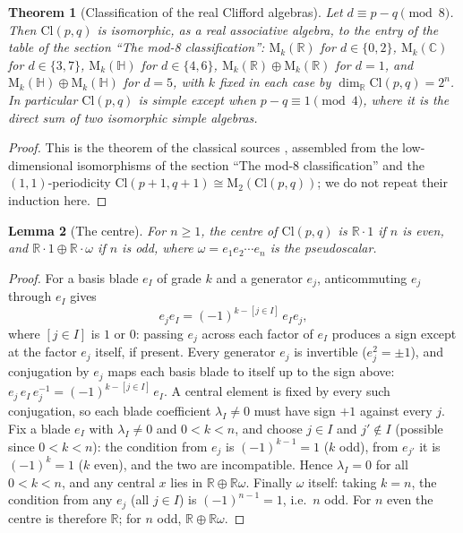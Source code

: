 \documentclass[11pt]{article}
\newtheorem{theorem}{Theorem}[section]
\newtheorem{lemma}[theorem]{Lemma}
\theoremstyle{definition}
\theoremstyle{plain}
\newcommand{\changedmark}[2]{\marginpar{\raggedright\scriptsize\color{#1}#2}}
\providecommand{\C}{}\renewcommand{\C}{\mathbb{C}}
\providecommand{\Cl}{}\renewcommand{\Cl}{\mathrm{Cl}}
\providecommand{\HH}{}\renewcommand{\HH}{\mathbb{H}}
\providecommand{\Mat}{}\renewcommand{\Mat}{\mathrm{M}}
\providecommand{\R}{}\renewcommand{\R}{\mathbb{R}}
\begin{document}
\begin{theorem}[Classification of the real Clifford algebras]\label{c:primer.classification-real-clifford-algebras}
\changedmark{BurntOrange}{changed since the deposit}
Let $d \equiv p - q \pmod 8$. Then $\Cl(p,q)$ is isomorphic, as a real associative algebra, to the entry of the table of the section ``The mod-8 classification'': $\Mat_k(\R)$ for $d \in \{0, 2\}$, $\Mat_k(\C)$ for $d \in \{3, 7\}$, $\Mat_k(\HH)$ for $d \in \{4, 6\}$, $\Mat_k(\R) \oplus \Mat_k(\R)$ for $d = 1$, and $\Mat_k(\HH) \oplus \Mat_k(\HH)$ for $d = 5$, with $k$ fixed in each case by $\dim_\R \Cl(p,q) = 2^n$. In particular $\Cl(p,q)$ is simple except when $p - q \equiv 1 \pmod 4$, where it is the direct sum of two isomorphic simple algebras.
\end{theorem}
\begin{proof}
This is the theorem of the classical sources \cite{ABS1964, Porteous1995, Lounesto2001}, assembled from the low-dimensional isomorphisms of the section ``The mod-8 classification'' and the $(1,1)$-periodicity $\Cl(p{+}1,q{+}1) \cong \Mat_2(\Cl(p,q))$; we do not repeat their induction here.

\end{proof}

\begin{lemma}[The centre]\label{c:primer.centre}
For $n \geq 1$, the centre of $\Cl(p,q)$ is $\R \cdot 1$ if $n$ is even, and $\R \cdot 1 \oplus \R \cdot \omega$ if $n$ is odd, where $\omega = e_1 e_2 \cdots e_n$ is the pseudoscalar.
\end{lemma}
\begin{proof}
For a basis blade $e_I$ of grade $k$ and a generator $e_j$, anticommuting $e_j$ through $e_I$ gives
\[
e_j e_I = (-1)^{k - [j \in I]}\, e_I e_j,
\]
where $[j \in I]$ is $1$ or $0$: passing $e_j$ across each factor of $e_I$ produces a sign except at the factor $e_j$ itself, if present. Every generator $e_j$ is invertible ($e_j^2 = \pm 1$), and conjugation by $e_j$ maps each basis blade to itself up to the sign above: $e_j\, e_I\, e_j^{-1} = (-1)^{k - [j \in I]}\, e_I$. A central element is fixed by every such conjugation, so each blade coefficient $\lambda_I \neq 0$ must have sign $+1$ against every $j$. Fix a blade $e_I$ with $\lambda_I \neq 0$ and $0 < k < n$, and choose $j \in I$ and $j' \notin I$ (possible since $0 < k < n$): the condition from $e_j$ is $(-1)^{k-1} = 1$ ($k$ odd), from $e_{j'}$ it is $(-1)^{k} = 1$ ($k$ even), and the two are incompatible. Hence $\lambda_I = 0$ for all $0 < k < n$, and any central $x$ lies in $\R \oplus \R\omega$. Finally $\omega$ itself: taking $k = n$, the condition from any $e_j$ (all $j \in I$) is $(-1)^{n-1} = 1$, i.e.\ $n$ odd. For $n$ even the centre is therefore $\R$; for $n$ odd, $\R \oplus \R\omega$.

\end{proof}
\end{document}
